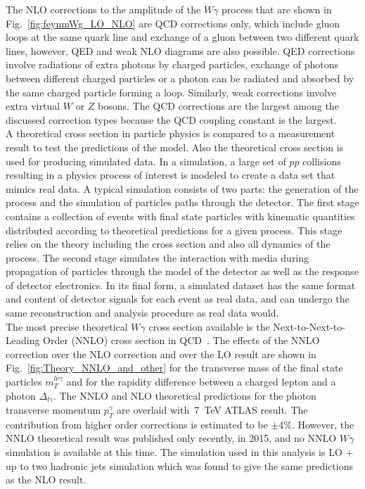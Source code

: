 The NLO corrections to the amplitude of the $W\gamma$ process that are shown in Fig.~\ref{fig:feynmWg_LO_NLO} are QCD corrections only, which include gluon loops at the same quark line and exchange of a gluon between two different quark lines, however, QED and weak NLO diagrams are also possible. QED corrections involve radiations of extra photons by charged particles, exchange of photons between different charged particles or a photon can be radiated and absorbed by the same charged particle forming a loop. Similarly, weak corrections involve extra virtual $W$ or $Z$ bosons. The QCD corrections are the largest among the discussed correction types because the QCD coupling constant is the largest.\\

A theoretical cross section in particle physics is compared to a measurement result to test the predictions of the model. Also the theoretical cross section is used for producing simulated data. In a simulation, a large set of $pp$ collisions resulting in a physics process of interest is modeled to create a data set that mimics real data. A typical simulation consists of two parts: the generation of the process and the simulation of particles paths through the detector. The first stage contains a collection of events with final state particles with kinematic quantities distributed according to theoretical predictions for a given process. This stage relies on the theory including the cross section and also all dynamics of the process. The second stage simulates the interaction with media during propagation of particles through the model of the detector as well as the response of detector electronics. In its final form, a simulated dataset has the same format and content of detector signals for each event as real data, and can undergo the same reconstruction and analysis procedure as real data would.\\

The most precise theoretical $W\gamma$ cross section available is the Next-to-Next-to-Leading Order (NNLO) cross section in QCD~\cite{ref_theory_NNLO}. The effects of the NNLO correction over the NLO correction and over the LO result are shown in Fig.~\ref{fig:Theory_NNLO_and_other} for the transverse mass of the final state particles $m_T^{l \nu \gamma}$ and for the rapidity difference between a charged lepton and a photon $\Delta_{l\gamma}$. The NNLO and NLO theoretical predictions for the photon transverse momentum $p_T^\gamma$ are overlaid with~7~TeV ATLAS result. The contribution from higher order corrections is estimated to be $\pm$4\%. However, the NNLO theoretical result was published only recently, in 2015, and no NNLO $W\gamma$ simulation is available at this time. The simulation used in this analysis is LO + up to two hadronic jets simulation which was found to give the same predictions as the NLO result.\\

